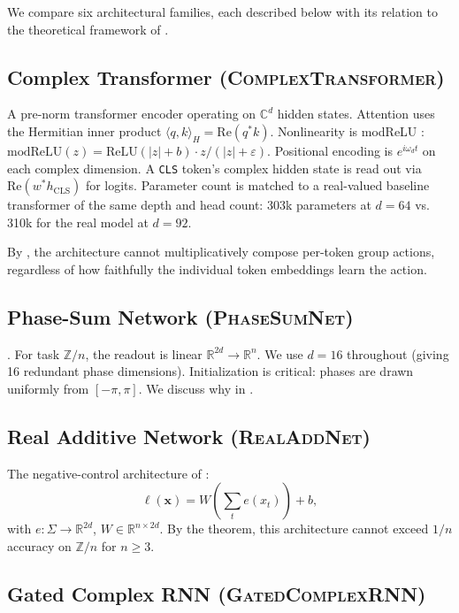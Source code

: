 \documentclass[11pt]{article}
\theoremstyle{definition}
\newcommand{\R}{\mathbb{R}}
\newcommand{\C}{\mathbb{C}}
\newcommand{\Z}{\mathbb{Z}}
\newcommand{\eps}{\varepsilon}
\begin{document}
We compare six architectural families, each described below with its
relation to the theoretical framework of .

\subsection{Complex Transformer (\textsc{ComplexTransformer})}

A pre-norm transformer encoder operating on $\C^d$ hidden states.
Attention uses the Hermitian inner product
$\langle q, k \rangle_H = \mathrm{Re}(q^* k)$. Nonlinearity is
modReLU \citep{trabelsi2018deep}:
$\mathrm{modReLU}(z) = \mathrm{ReLU}(|z| + b)\cdot z / (|z| + \eps)$.
Positional encoding is $e^{i \omega_d t}$ on each complex
dimension. A \texttt{CLS} token's complex hidden state is read out
via $\mathrm{Re}(w^* h_\mathrm{CLS})$ for logits. Parameter count is
matched to a real-valued baseline transformer of the same depth and
head count: 303k parameters at $d=64$ vs. 310k for the real model at
$d=92$.

By , the architecture cannot
multiplicatively compose per-token group actions, regardless of how
faithfully the individual token embeddings learn the action.

\subsection{Phase-Sum Network (\textsc{PhaseSumNet})}

. For task $\Z/n$, the readout is linear
$\R^{2d} \to \R^n$. We use $d=16$ throughout (giving 16 redundant
phase dimensions). Initialization is critical: phases are drawn
uniformly from $[-\pi, \pi]$. We discuss why in
.

\subsection{Real Additive Network (\textsc{RealAddNet})}

The negative-control architecture of :
\[
\ell(\mathbf{x}) = W\!\left(\sum_t e(x_t)\right) + b,
\]
with $e: \Sigma \to \R^{2d}$, $W \in \R^{n \times 2d}$. By the
theorem, this architecture cannot exceed $1/n$ accuracy on
$\Z/n$ for $n \geq 3$.

\subsection{Gated Complex RNN (\textsc{GatedComplexRNN})}
\end{document}
